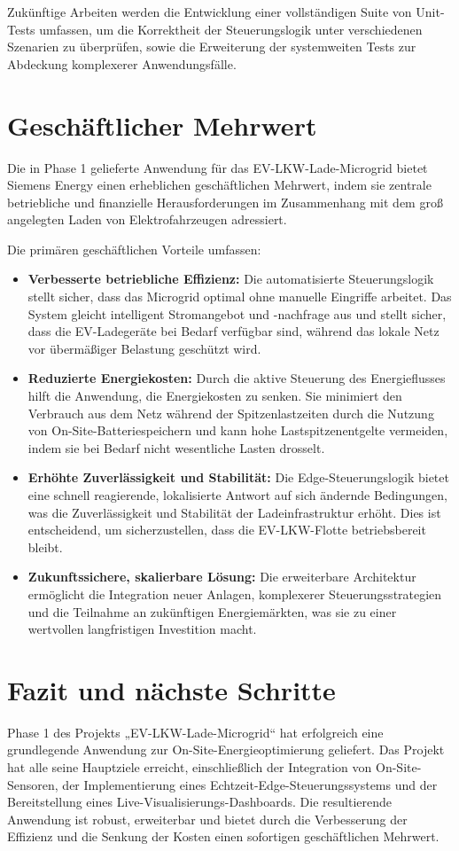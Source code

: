 \documentclass{article}
\begin{document}
Zukünftige Arbeiten werden die Entwicklung einer vollständigen Suite von Unit-Tests umfassen, um die Korrektheit der Steuerungslogik unter verschiedenen Szenarien zu überprüfen, sowie die Erweiterung der systemweiten Tests zur Abdeckung komplexerer Anwendungsfälle.

\section{Geschäftlicher Mehrwert}
Die in Phase 1 gelieferte Anwendung für das EV-LKW-Lade-Microgrid bietet Siemens Energy einen erheblichen geschäftlichen Mehrwert, indem sie zentrale betriebliche und finanzielle Herausforderungen im Zusammenhang mit dem groß angelegten Laden von Elektrofahrzeugen adressiert.

Die primären geschäftlichen Vorteile umfassen:
\begin{itemize}
    \item \textbf{Verbesserte betriebliche Effizienz:} Die automatisierte Steuerungslogik stellt sicher, dass das Microgrid optimal ohne manuelle Eingriffe arbeitet. Das System gleicht intelligent Stromangebot und -nachfrage aus und stellt sicher, dass die EV-Ladegeräte bei Bedarf verfügbar sind, während das lokale Netz vor übermäßiger Belastung geschützt wird.
    \item \textbf{Reduzierte Energiekosten:} Durch die aktive Steuerung des Energieflusses hilft die Anwendung, die Energiekosten zu senken. Sie minimiert den Verbrauch aus dem Netz während der Spitzenlastzeiten durch die Nutzung von On-Site-Batteriespeichern und kann hohe Lastspitzenentgelte vermeiden, indem sie bei Bedarf nicht wesentliche Lasten drosselt.
    \item \textbf{Erhöhte Zuverlässigkeit und Stabilität:} Die Edge-Steuerungslogik bietet eine schnell reagierende, lokalisierte Antwort auf sich ändernde Bedingungen, was die Zuverlässigkeit und Stabilität der Ladeinfrastruktur erhöht. Dies ist entscheidend, um sicherzustellen, dass die EV-LKW-Flotte betriebsbereit bleibt.
    \item \textbf{Zukunftssichere, skalierbare Lösung:} Die erweiterbare Architektur ermöglicht die Integration neuer Anlagen, komplexerer Steuerungsstrategien und die Teilnahme an zukünftigen Energiemärkten, was sie zu einer wertvollen langfristigen Investition macht.
\end{itemize}

\section{Fazit und nächste Schritte}
Phase 1 des Projekts „EV-LKW-Lade-Microgrid“ hat erfolgreich eine grundlegende Anwendung zur On-Site-Energieoptimierung geliefert. Das Projekt hat alle seine Hauptziele erreicht, einschließlich der Integration von On-Site-Sensoren, der Implementierung eines Echtzeit-Edge-Steuerungssystems und der Bereitstellung eines Live-Visualisierungs-Dashboards. Die resultierende Anwendung ist robust, erweiterbar und bietet durch die Verbesserung der Effizienz und die Senkung der Kosten einen sofortigen geschäftlichen Mehrwert.
\end{document}
